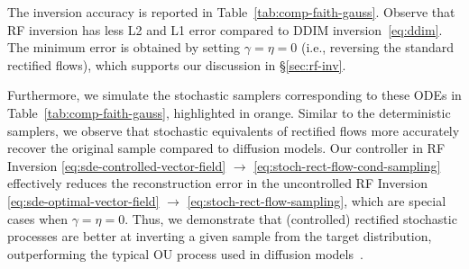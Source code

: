 \documentclass{article} %
\theoremstyle{plain}
\begin{document}
The inversion accuracy is reported in Table~\ref{tab:comp-faith-gauss}.
Observe that RF inversion has less L2 and L1 error compared to DDIM inversion~\eqref{eq:ddim}.
The minimum error is obtained by setting $\gamma=\eta=0$ (i.e., reversing the standard rectified flows), which supports our discussion in \S\ref{sec:rf-inv}. 

Furthermore, we simulate the stochastic samplers corresponding to these ODEs in Table~\ref{tab:comp-faith-gauss}, highlighted in {\color{orange}orange}.
Similar to the deterministic samplers, we observe that stochastic equivalents of rectified flows more accurately recover the original sample compared to diffusion models.
Our controller in RF Inversion \eqref{eq:sde-controlled-vector-field} $\rightarrow$ \eqref{eq:stoch-rect-flow-cond-sampling} effectively reduces the reconstruction error in the uncontrolled RF Inversion \eqref{eq:sde-optimal-vector-field} $\rightarrow$ \eqref{eq:stoch-rect-flow-sampling}, which are special cases when $\gamma=\eta=0$.
Thus, we demonstrate that (controlled) rectified stochastic processes are better at inverting a given sample from the target distribution, outperforming the typical OU process used in diffusion models~\citep{ncsn,ddpm,ddim,songscore}. 
\end{document}
